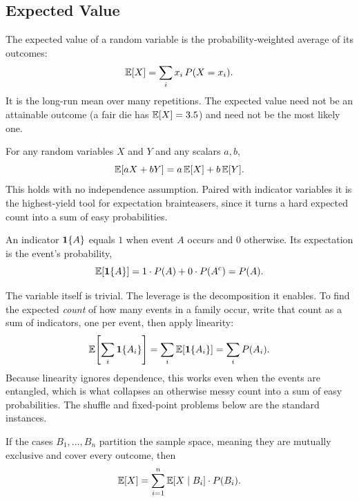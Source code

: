 \subsection{Expected Value}

\begin{definition}
The expected value of a random variable is the probability-weighted average of its outcomes:
\[
\mathbb{E}[X] = \sum_i x_i \, P(X = x_i).
\]
It is the long-run mean over many repetitions. The expected value need not be an attainable outcome (a fair die has $\mathbb{E}[X] = 3.5$) and need not be the most likely one.
\end{definition}

\begin{keybox}
For any random variables $X$ and $Y$ and any scalars $a, b$,
\[
\mathbb{E}[aX + bY] = a\,\mathbb{E}[X] + b\,\mathbb{E}[Y].
\]
This holds with no independence assumption. Paired with indicator variables it is the highest-yield tool for expectation brainteasers, since it turns a hard expected count into a sum of easy probabilities.
\end{keybox}

\begin{definition}
An indicator $\mathbf{1}\{A\}$ equals $1$ when event $A$ occurs and $0$ otherwise. Its expectation is the event's probability,
\[
\mathbb{E}[\mathbf{1}\{A\}] = 1 \cdot P(A) + 0 \cdot P(A^c) = P(A).
\]
\end{definition}

The variable itself is trivial. The leverage is the decomposition it enables. To find the expected \textit{count} of how many events in a family occur, write that count as a sum of indicators, one per event, then apply linearity:
\[
\mathbb{E}\!\left[\sum_i \mathbf{1}\{A_i\}\right] = \sum_i \mathbb{E}[\mathbf{1}\{A_i\}] = \sum_i P(A_i).
\]
Because linearity ignores dependence, this works even when the events are entangled, which is what collapses an otherwise messy count into a sum of easy probabilities. The shuffle and fixed-point problems below are the standard instances.

\begin{theorem}
If the cases $B_1, \dots, B_n$ partition the sample space, meaning they are mutually exclusive and cover every outcome, then
\[
\mathbb{E}[X] = \sum_{i=1}^{n} \mathbb{E}[X \mid B_i] \cdot P(B_i).
\]
\end{theorem}

